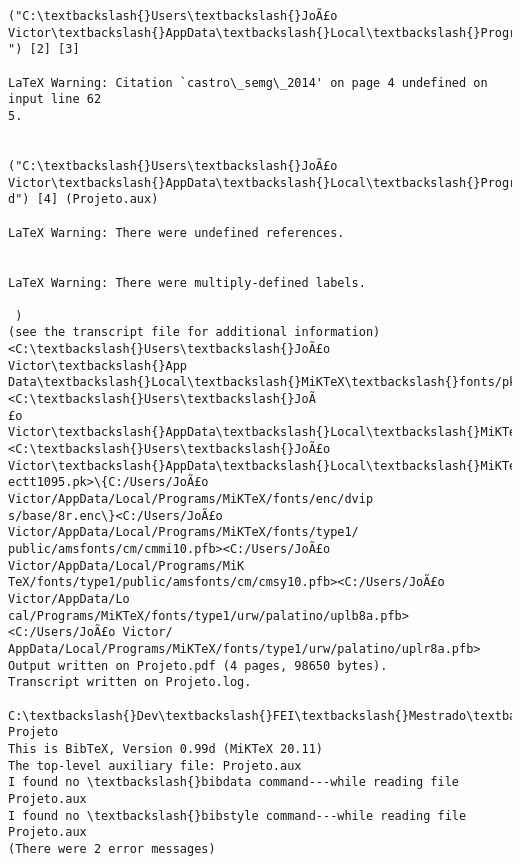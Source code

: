 \documentclass[11pt]{article}
\begin{document}
\begin{Verbatim}[commandchars=\\\{\}]
("C:\textbackslash{}Users\textbackslash{}JoÃ£o Victor\textbackslash{}AppData\textbackslash{}Local\textbackslash{}Programs\textbackslash{}MiKTeX\textbackslash{}tex/latex/base\textbackslash{}ts1cmtt.fd
") [2] [3]

LaTeX Warning: Citation `castro\_semg\_2014' on page 4 undefined on input line 62
5.


("C:\textbackslash{}Users\textbackslash{}JoÃ£o Victor\textbackslash{}AppData\textbackslash{}Local\textbackslash{}Programs\textbackslash{}MiKTeX\textbackslash{}tex/latex/psnfss\textbackslash{}ts1ppl.f
d") [4] (Projeto.aux)

LaTeX Warning: There were undefined references.


LaTeX Warning: There were multiply-defined labels.

 )
(see the transcript file for additional information) <C:\textbackslash{}Users\textbackslash{}JoÃ£o Victor\textbackslash{}App
Data\textbackslash{}Local\textbackslash{}MiKTeX\textbackslash{}fonts/pk/ljfour/jknappen/ec/dpi600\textbackslash{}ecit1095.pk> <C:\textbackslash{}Users\textbackslash{}JoÃ
£o Victor\textbackslash{}AppData\textbackslash{}Local\textbackslash{}MiKTeX\textbackslash{}fonts/pk/ljfour/jknappen/ec/dpi600\textbackslash{}tctt1095.pk>
<C:\textbackslash{}Users\textbackslash{}JoÃ£o Victor\textbackslash{}AppData\textbackslash{}Local\textbackslash{}MiKTeX\textbackslash{}fonts/pk/ljfour/jknappen/ec/dpi600\textbackslash{}
ectt1095.pk>\{C:/Users/JoÃ£o Victor/AppData/Local/Programs/MiKTeX/fonts/enc/dvip
s/base/8r.enc\}<C:/Users/JoÃ£o Victor/AppData/Local/Programs/MiKTeX/fonts/type1/
public/amsfonts/cm/cmmi10.pfb><C:/Users/JoÃ£o Victor/AppData/Local/Programs/MiK
TeX/fonts/type1/public/amsfonts/cm/cmsy10.pfb><C:/Users/JoÃ£o Victor/AppData/Lo
cal/Programs/MiKTeX/fonts/type1/urw/palatino/uplb8a.pfb><C:/Users/JoÃ£o Victor/
AppData/Local/Programs/MiKTeX/fonts/type1/urw/palatino/uplr8a.pfb>
Output written on Projeto.pdf (4 pages, 98650 bytes).
Transcript written on Projeto.log.

C:\textbackslash{}Dev\textbackslash{}FEI\textbackslash{}Mestrado\textbackslash{}3\_Periodo\textbackslash{}PEL301\_Biopotenciais\textbackslash{}Projeto>bibtex Projeto
This is BibTeX, Version 0.99d (MiKTeX 20.11)
The top-level auxiliary file: Projeto.aux
I found no \textbackslash{}bibdata command---while reading file Projeto.aux
I found no \textbackslash{}bibstyle command---while reading file Projeto.aux
(There were 2 error messages)


\end{Verbatim}
\end{document}
